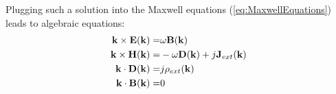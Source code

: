 Plugging such a solution into the Maxwell equations (\ref{eq:MaxwellEquations}) leads to algebraic equations:
\begin{subequations}
	\begin{align}
		{\mathbf k} \times {\mathbf E} ({\mathbf k}) 
		=& 
		\omega {\mathbf B} ({\mathbf k})
		\\
		{\mathbf k} \times {\mathbf H} ({\mathbf k}) 
		=& 
		-\omega {\mathbf D} ({\mathbf k})
		+ 	
		j{\mathbf J}_{ext} ({\mathbf k}) 
		\\
		{\mathbf k}  \cdot {\mathbf D} ({\mathbf k}) 
		=& j \rho_{ext}({\mathbf k}) 
		\\
		{\mathbf k}  \cdot {\mathbf B} ({\mathbf k}) 
		=& 0
	\end{align}
	\label{eq:k-omegaMaxwellEquations}
\end{subequations}

